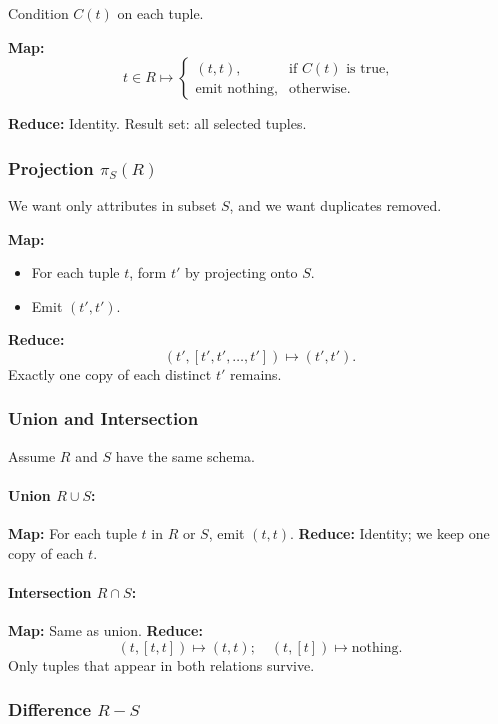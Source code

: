 \documentclass[11pt]{article}
\begin{document}
Condition $C(t)$ on each tuple.

\textbf{Map:}
\[
    t\in R \mapsto
    \begin{cases}
        (t, t), & \text{if } C(t)\text{ is true},\\
        \text{emit nothing}, & \text{otherwise}.
    \end{cases}
\]

\textbf{Reduce:} Identity.  
Result set: all selected tuples.

\subsubsection*{Projection $\pi_S(R)$}

We want only attributes in subset $S$, and we want duplicates removed.

\textbf{Map:}
\begin{itemize}
    \item For each tuple $t$, form $t'$ by projecting onto $S$.
    \item Emit $(t', t')$.
\end{itemize}

\textbf{Reduce:}
\[
    (t', [t', t', \dots, t']) \mapsto (t', t').
\]
Exactly one copy of each distinct $t'$ remains.

\subsubsection*{Union and Intersection}

Assume $R$ and $S$ have the same schema.

\paragraph{Union $R \cup S$:}
\textbf{Map:} For each tuple $t$ in $R$ or $S$, emit $(t,t)$.  
\textbf{Reduce:} Identity; we keep one copy of each $t$.

\paragraph{Intersection $R \cap S$:}
\textbf{Map:} Same as union.  
\textbf{Reduce:}
\[
    (t, [t,t]) \mapsto (t,t); \quad (t,[t]) \mapsto \text{nothing}.
\]
Only tuples that appear in both relations survive.

\subsubsection*{Difference $R - S$}
\end{document}
